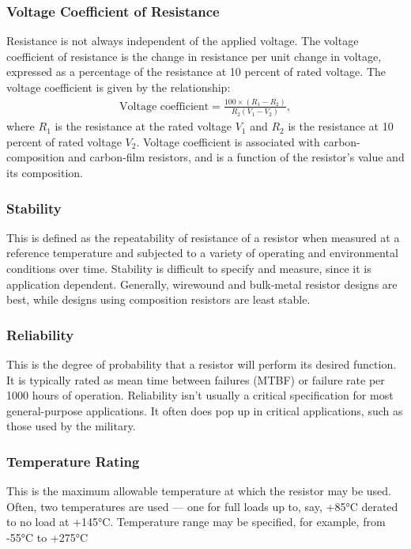 \documentclass[../../document]{subfiles}
\begin{document}
\subsubsection{Voltage Coefficient of Resistance}
Resistance is not always independent of the applied voltage. The voltage
coefficient of resistance is the change in resistance per unit change in
voltage, expressed as a percentage of the resistance at 10 percent of rated
voltage. The voltage coefficient is given by the relationship:
\cite{practical_electronics}
\begin{gather}
	\text{Voltage coefficient} = \frac{100\times(R_1-R_2)}{R_2(V_1-V_2)},
\end{gather}
where \(R_1\)  is the resistance at the rated voltage \(V_1\) and \(R_2\)  is
the resistance at 10 percent of rated voltage \(V_2\). Voltage coefficient is
associated with carbon-composition and carbon-film resistors, and is a function
of the resistor's value and its composition. \cite{practical_electronics}

\subsubsection{Stability}
This is defined as the repeatability of resistance of a resistor when measured
at a reference temperature and subjected to a variety of operating and
environmental conditions over time. Stability is difficult to specify and
measure, since it is application dependent. Generally, wirewound and bulk-metal
resistor designs are best, while designs using composition resistors are least
stable. \cite{practical_electronics}

\subsubsection{Reliability}
This is the degree of probability that a resistor will perform its desired
function. It is typically rated as mean time between failures (MTBF) or failure
rate per 1000 hours of operation. Reliability isn't usually a critical
specification for most general-purpose applications. It often does pop up in
critical applications, such as those used by the military.
\cite{practical_electronics}

\subsubsection{Temperature Rating}
This is the maximum allowable temperature at which the resistor may be used.
Often, two temperatures are used --- one for full loads up to, say,
+85\unit{\celsius} derated to no load at +145\unit{\celsius}. Temperature range
may be specified, for example, from -55\unit{\celsius} to +275\unit{\celsius}
\cite{practical_electronics}
\end{document}
